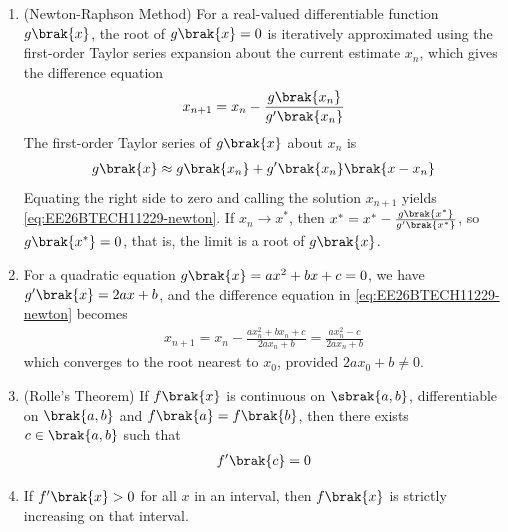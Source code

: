 \begin{enumerate}[label=\thesubsection.\arabic*, ref=\thesubsection.\theenumi]
\begin{align}
	f_1^{\prime}\brak{a} = f_2^{\prime}\brak{a}
	\label{eq:EE26BTECH11229-piecewise-diff}
\end{align}
\item (Newton-Raphson Method) For a real-valued differentiable function $g\brak{x}$, the root of $g\brak{x} = 0$ is iteratively approximated using the first-order Taylor series expansion about the current estimate $x_n$, which gives the difference equation
\begin{align}
	x_{n+1} = x_n - \frac{g\brak{x_n}}{g^{\prime}\brak{x_n}}
	\label{eq:EE26BTECH11229-newton}
\end{align}
\solution
The first-order Taylor series of $g\brak{x}$ about $x_n$ is
\begin{align}
	g\brak{x} \approx g\brak{x_n} + g^{\prime}\brak{x_n}\brak{x - x_n}
\end{align}
Equating the right side to zero and calling the solution $x_{n+1}$ yields \eqref{eq:EE26BTECH11229-newton}. If $x_n \to x^*$, then $x^* = x^* - \frac{g\brak{x^*}}{g^{\prime}\brak{x^*}}$, so $g\brak{x^*} = 0$, that is, the limit is a root of $g\brak{x}$.
\item For a quadratic equation $g\brak{x} = ax^2 + bx + c = 0$, we have $g^{\prime}\brak{x} = 2ax + b$, and the difference equation in \eqref{eq:EE26BTECH11229-newton} becomes
\begin{align}
	x_{n+1} = x_n - \frac{ax_n^2 + bx_n + c}{2ax_n + b} = \frac{ax_n^2 - c}{2ax_n + b}
	\label{eq:EE26BTECH11229-newton-quad}
\end{align}
which converges to the root nearest to $x_0$, provided $2ax_0 + b \neq 0$.
\item (Rolle's Theorem) If $f\brak{x}$ is continuous on $\sbrak{a, b}$, differentiable on $\brak{a, b}$ and $f\brak{a} = f\brak{b}$, then there exists $c \in \brak{a, b}$ such that
\begin{align}
	f^{\prime}\brak{c} = 0
	\label{eq:EE26BTECH11229-rolle}
\end{align}
\item If $f^{\prime}\brak{x} > 0$ for all $x$ in an interval, then $f\brak{x}$ is strictly increasing on that interval.
\label{eq:EE26BTECH11229-increasing}


\end{enumerate}
